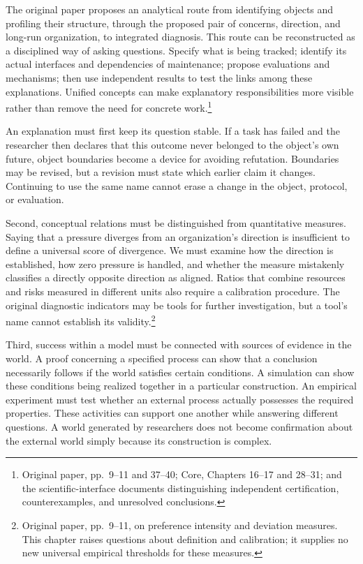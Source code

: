 \documentclass[
  english,
  11pt,
  oneside]{book}
\begin{document}
The original paper proposes an analytical route from identifying objects and profiling their structure, through the proposed pair of concerns, direction, and long-run organization, to integrated diagnosis. This route can be reconstructed as a disciplined way of asking questions. Specify what is being tracked; identify its actual interfaces and dependencies of maintenance; propose evaluations and mechanisms; then use independent results to test the links among these explanations. Unified concepts can make explanatory responsibilities more visible rather than remove the need for concrete work.\footnote{\hypertarget{ph-note-63}{}Original paper, pp.~9--11 and 37--40; Core, Chapters 16--17 and 28--31; and the scientific-interface documents distinguishing independent certification, counterexamples, and unresolved conclusions.}

An explanation must first keep its question stable. If a task has failed and the researcher then declares that this outcome never belonged to the object's own future, object boundaries become a device for avoiding refutation. Boundaries may be revised, but a revision must state which earlier claim it changes. Continuing to use the same name cannot erase a change in the object, protocol, or evaluation.

Second, conceptual relations must be distinguished from quantitative measures. Saying that a pressure diverges from an organization's direction is insufficient to define a universal score of divergence. We must examine how the direction is established, how zero pressure is handled, and whether the measure mistakenly classifies a directly opposite direction as aligned. Ratios that combine resources and risks measured in different units also require a calibration procedure. The original diagnostic indicators may be tools for further investigation, but a tool's name cannot establish its validity.\footnote{\hypertarget{ph-note-64}{}Original paper, pp.~9--11, on preference intensity and deviation measures. This chapter raises questions about definition and calibration; it supplies no new universal empirical thresholds for these measures.}

Third, success within a model must be connected with sources of evidence in the world. A proof concerning a specified process can show that a conclusion necessarily follows if the world satisfies certain conditions. A simulation can show these conditions being realized together in a particular construction. An empirical experiment must test whether an external process actually possesses the required properties. These activities can support one another while answering different questions. A world generated by researchers does not become confirmation about the external world simply because its construction is complex.
\end{document}
